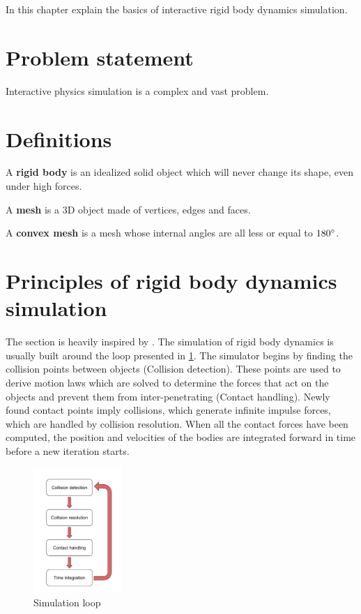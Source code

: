 In this chapter explain the basics of interactive rigid body dynamics simulation.

\section{Problem statement}
Interactive physics simulation is a complex and vast problem. 

\section{Definitions}
A \textbf{rigid body }is an idealized solid object which will never change its shape, even under high forces.

A \textbf{mesh} is a 3D object made of vertices, edges and faces. 

A \textbf{convex mesh} is a mesh whose internal angles are all less or equal to $180\degree$.

\section{Principles of rigid body dynamics simulation}
The section is heavily inspired by \cite{bender2014interactive}. The simulation of rigid body dynamics is usually built around the loop presented in \cref{fig:star_simul_loop}. The simulator begins by finding the collision points between objects (Collision detection). These points are used to derive motion laws which are solved to determine the forces that act on the objects and prevent them from inter-penetrating (Contact handling). Newly found contact points imply collisions, which generate infinite impulse forces, which are handled by collision resolution. When all the contact forces have been computed, the position and velocities of the bodies are integrated forward in time before a new iteration starts.

\begin{figure}[htp]
\center
\includegraphics[width=0.3\textwidth]{figures/star_simul_loop2}
\caption[Simulation loop]{Simulation loop}
\label{fig:star_simul_loop}
\end{figure}

